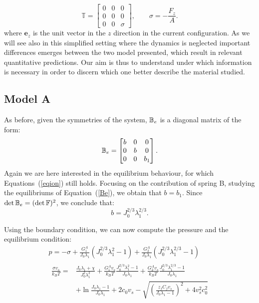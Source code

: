 \begin{equation}
\mathbb{T}= \begin{bmatrix}
0 &0&0\\
0&0&0\\
0&0& \sigma
\end{bmatrix}, \qquad \sigma = -\frac{F_z}{A}.
\end{equation} 
where $\mathbf{e}_z$ is the unit vector in the $z$ direction in the current configuration. As we will see also in this simplified setting where the dynamics is neglected important differences emerges between the two model presented, which result in relevant quantitative predictions. Our aim is thus to understand under which information is necessary in order to discern which one better describe the material studied. 

\subsection{Model A}
As before, given the symmetries of the system, $\mathbb{B}_e$ is a diagonal matrix of the form:
\begin{equation}
\mathbb{B}_e=\begin{bmatrix}
b &0&0\\
0&b&0\\
0&0& b_1
\end{bmatrix}. 
\end{equation}
Again we are here interested in the equilibrium behaviour, for which Equations~(\ref{eqion}) still holds. Focusing on the contribution of spring B, studying the equilibriums of Equation~(\ref{Be}), we obtain that $b=b_1$. Since $\det \mathbb{B}_e= (\det \mathbb{F})^2$, we conclude that:
\begin{equation}
b = J_0^{2/3}\lambda_1^{2/3}.
\end{equation}

Using the boundary condition, we can now compute the pressure and the equilibrium condition:
\begin{gather}
p = -\sigma + \frac{G^A_1}{J_0\lambda_1} (J^{2/3}_0\lambda_1^2-1)+\frac{G^A_2}{J_0\lambda_1} (J_0^{2/3} \lambda_1^{2/3}-1) \\
\begin{aligned}
\frac{\sigma v_s}{k_B T}=&\frac{J_0\lambda_1+\chi}{J_0^2\lambda^2_1}+\frac{G_1^Av_s}{k_BT} \frac{J_0^{2/3}\lambda^2_1-1}{J_0 \lambda_1}+\frac{G_2^Av_s}{k_BT} \frac{J_0^{2/3}\lambda^{2/3}_1-1}{J_0 \lambda_1}\\[1.5mm]
&+\ln \frac{J_0\lambda_1-1}{J_0\lambda_1} +2c_0v_s-\sqrt{\left(\frac{z_fC_fv_s}{J_0\lambda_1-1}\right)^2+4v_s^2c^2_0}\label{compA}
\end{aligned}
\end{gather}

